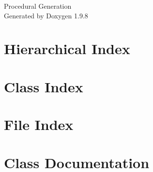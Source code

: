 \documentclass[twoside]{book}
\newcommand{\+}{\discretionary{\mbox{\scriptsize$\hookleftarrow$}}{}{}}
\newcommand{\clearemptydoublepage}{%
    \newpage{\pagestyle{empty}\cleardoublepage}%
  }
\begin{document}
  \raggedbottom
    \hypersetup{pageanchor=false,
                bookmarksnumbered=true,
                pdfencoding=unicode
               }
  \begin{titlepage}
  \vspace*{7cm}
  \begin{center}%
  {\Large Procedural Generation}\\
  \vspace*{1cm}
  {\large Generated by Doxygen 1.9.8}\\
  \end{center}
  \end{titlepage}
  \clearemptydoublepage
  \tableofcontents
  \clearemptydoublepage
  \hypersetup{pageanchor=true}
\chapter{Hierarchical Index}

\chapter{Class Index}

\chapter{File Index}

\chapter{Class Documentation}

























\end{document}

